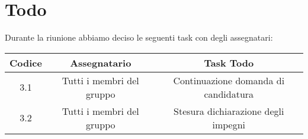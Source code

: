 \section{Todo}

Durante la riunione abbiamo deciso le seguenti task con degli assegnatari:

\vspace{0.5cm}

\begin{table}[htbp]
	\begin{tabular}{|c|c|c|}
		\hline
		\rowcolor[gray]{0.9}
		Codice & Assegnatario & Task Todo \\
		\hline
		3.1 & Tutti i membri del gruppo & Continuazione domanda di candidatura \\
		\hline
		3.2 & Tutti i membri del gruppo & Stesura dichiarazione degli impegni \\
		\hline
	\end{tabular}
\end{table}